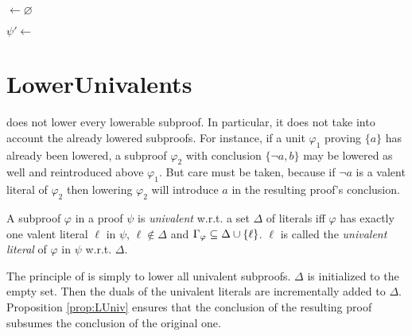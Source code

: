 \documentclass{llncs}
\begin{document}
\begin{algorithm}[bt]
  \BlankLine

  \Units $\leftarrow \varnothing$ \;
  \BlankLine

  \BlankLine

  $\psi' \leftarrow $ \Rec{$\psi$,$\Units$} \;
  \BlankLine


  \caption{\LowerUnits}
  \label{algo:LU}
\end{algorithm}




\section{LowerUnivalents} \label{sec:LUniv}

{\LowerUnits} does not lower every lowerable subproof. In particular, it does not take into
account the already lowered subproofs. For instance, if a unit $\varphi_1$ proving $\{a\}$ has
already been lowered, a subproof $\varphi_2$ with conclusion $\{\neg a,b\}$ may be lowered as well and
reintroduced above $\varphi_1$. But care must be taken, because if $\neg a$ is a valent literal of
$\varphi_2$ then lowering $\varphi_2$ will introduce $a$ in the resulting proof's conclusion.

\begin{definition}
A subproof $\varphi$ in a proof $\psi$ is \emph{univalent} w.r.t. a set $\Delta$ of literals iff
$\varphi$ has exactly one valent literal $\ell$ in $\psi$, $\ell \notin \Delta$ and
$\Gamma_{\varphi} \subseteq \Delta \cup \left\{ \ell \right\}$. $\ell$ is called the \emph{univalent
literal} of $\varphi$ in $\psi$ w.r.t.  $\Delta$.
\end{definition}

The principle of {\LowerUnivalents} is simply to lower all univalent subproofs. $\Delta$ is
initialized to the empty set. Then the duals of the univalent literals are incrementally added to
$\Delta$. Proposition \ref{prop:LUniv} ensures that the conclusion of the resulting proof
subsumes the conclusion of the original one.
\end{document}
